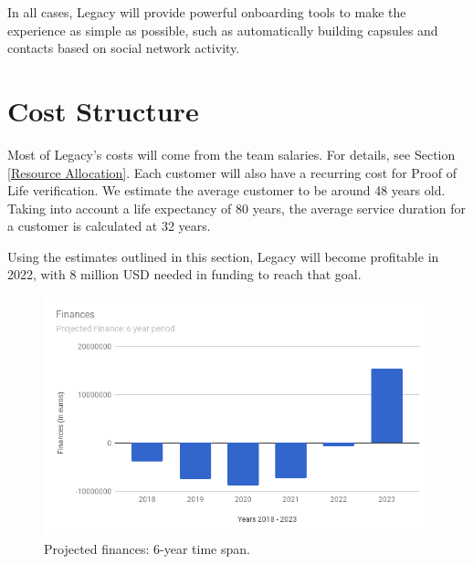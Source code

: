 In all cases, Legacy will provide powerful onboarding tools to make the experience as simple as possible, such as automatically building capsules and contacts based on social network activity.

\section{Cost Structure} %
\label{sec:cost_structure}
Most of Legacy’s costs will come from the team salaries. For details, see Section \ref{Resource Allocation}.
Each customer will also have a recurring cost for Proof of Life verification. We estimate the average customer to be around 48 years old. Taking into account a life expectancy of 80 years, the average service duration for a customer is calculated at 32 years.

Using the estimates outlined in this section, Legacy will become profitable in 2022, with 8 million USD needed in funding to reach that goal.

\begin{figure}[h]
  \centering
  \includegraphics[scale=0.5]{fig/finances_chart}
  \caption{Projected finances: 6-year time span.}
  \label{fig:projected_finances}
\end{figure} 


